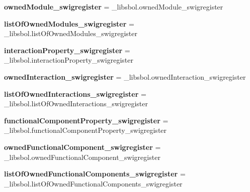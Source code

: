 \begin{DoxyCompactItemize}
\item 
{\bfseries owned\+Module\+\_\+swigregister} = \+\_\+libsbol.\+owned\+Module\+\_\+swigregister\hypertarget{namespacesbol_1_1libsbol_a01dc60241ae2cf7e8131e20ea59262fb}{}\label{namespacesbol_1_1libsbol_a01dc60241ae2cf7e8131e20ea59262fb}

\item 
{\bfseries list\+Of\+Owned\+Modules\+\_\+swigregister} = \+\_\+libsbol.\+list\+Of\+Owned\+Modules\+\_\+swigregister\hypertarget{namespacesbol_1_1libsbol_afe33ca25e1803674812fb2f7daf8b767}{}\label{namespacesbol_1_1libsbol_afe33ca25e1803674812fb2f7daf8b767}

\item 
{\bfseries interaction\+Property\+\_\+swigregister} = \+\_\+libsbol.\+interaction\+Property\+\_\+swigregister\hypertarget{namespacesbol_1_1libsbol_a1a9e1a51a92ea1f7649e2d288176617e}{}\label{namespacesbol_1_1libsbol_a1a9e1a51a92ea1f7649e2d288176617e}

\item 
{\bfseries owned\+Interaction\+\_\+swigregister} = \+\_\+libsbol.\+owned\+Interaction\+\_\+swigregister\hypertarget{namespacesbol_1_1libsbol_a4bede415a3cf4ea453ea2a34192ccc29}{}\label{namespacesbol_1_1libsbol_a4bede415a3cf4ea453ea2a34192ccc29}

\item 
{\bfseries list\+Of\+Owned\+Interactions\+\_\+swigregister} = \+\_\+libsbol.\+list\+Of\+Owned\+Interactions\+\_\+swigregister\hypertarget{namespacesbol_1_1libsbol_af1c39b512b35a515d87026eba48922a8}{}\label{namespacesbol_1_1libsbol_af1c39b512b35a515d87026eba48922a8}

\item 
{\bfseries functional\+Component\+Property\+\_\+swigregister} = \+\_\+libsbol.\+functional\+Component\+Property\+\_\+swigregister\hypertarget{namespacesbol_1_1libsbol_a8092317b7d00f078a7841e3f491a0a04}{}\label{namespacesbol_1_1libsbol_a8092317b7d00f078a7841e3f491a0a04}

\item 
{\bfseries owned\+Functional\+Component\+\_\+swigregister} = \+\_\+libsbol.\+owned\+Functional\+Component\+\_\+swigregister\hypertarget{namespacesbol_1_1libsbol_aca6cc45293020f143872e3979d9be76e}{}\label{namespacesbol_1_1libsbol_aca6cc45293020f143872e3979d9be76e}

\item 
{\bfseries list\+Of\+Owned\+Functional\+Components\+\_\+swigregister} = \+\_\+libsbol.\+list\+Of\+Owned\+Functional\+Components\+\_\+swigregister\hypertarget{namespacesbol_1_1libsbol_a2fb83bd6b8891e321462d0f02247df81}{}\label{namespacesbol_1_1libsbol_a2fb83bd6b8891e321462d0f02247df81}


\end{DoxyCompactItemize}
